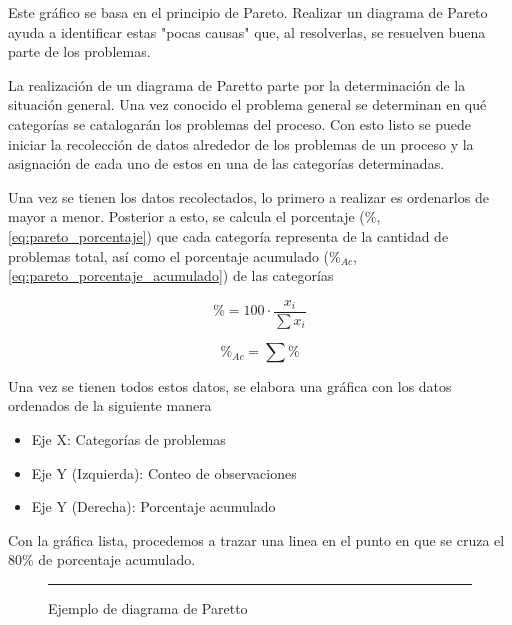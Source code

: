 Este gráfico se basa en el principio de Pareto. Realizar un diagrama de Pareto ayuda a identificar estas "pocas causas" que, al resolverlas, se resuelven buena parte de los problemas.


La realización de un diagrama de Paretto parte por la determinación de la situación general. Una vez conocido el problema general se determinan en qué categorías se catalogarán los problemas del proceso. Con esto listo se puede iniciar la recolección de datos alrededor de los problemas de un proceso y la asignación de cada uno de estos en una de las categorías determinadas.

Una vez se tienen los datos recolectados, lo primero a realizar es ordenarlos de mayor a menor. Posterior a esto, se calcula el porcentaje ($\%$, \autoref{eq:pareto_porcentaje}) que cada categoría representa de la cantidad de problemas total, así como el porcentaje acumulado ($\%_{Ac}$, \autoref{eq:pareto_porcentaje_acumulado}) de las categorías

\begin{equation}\label{eq:pareto_porcentaje}
    \% = 100\cdot\frac{x_{i}}{\sum{x_{i}}}
\end{equation}

\begin{equation}\label{eq:pareto_porcentaje_acumulado}
    \%_{Ac} = \sum{\%}
\end{equation}

Una vez se tienen todos estos datos, se elabora una gráfica con los datos ordenados de la siguiente manera

\begin{itemize}
    \item Eje X: Categorías de problemas
    \item Eje Y (Izquierda): Conteo de observaciones
    \item Eje Y (Derecha): Porcentaje acumulado
\end{itemize}

Con la gráfica lista, procedemos a trazar una linea en el punto en que se cruza el 80\% de porcentaje acumulado.

\begin{figure}\centering
    \resizebox{\linewidth}{!}{}
    \rule{\linewidth}{0.5pt}
    \caption{Ejemplo de diagrama de Paretto}
    \label{fig:diagrama_de_pareto}
\end{figure}